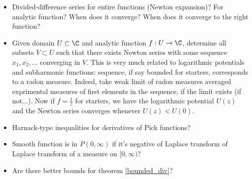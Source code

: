 \begin{itemize}
	\item Divided-difference series for entire functions (Newton expansion)? For analytic function? When does it converge? When does it converge to the right function?
	\item Given domain $U \subset \C$ and analytic function $f : U \to \C$, determine all subsets $V \subset U$ such that there exists Newton series with some sequence $x_{1}, x_{2}, \ldots$ converging in $V$. This is very much related to logarithmic potentials and subharmonic functions: sequence, if say bounded for starters, corresponds to a radon measure. Indeed, take weak limit of radon measures averaged exprimental measures of first elements in the sequence, if the limit exists (if not...). Now if $f = \frac{1}{z}$ for starters, we have the logarithmic potential $U(z)$ and the Newton series converges whenever $U(z) < U(0)$.
	\item Harnack-type inequalities for derivatives of Pick functions?
	\item Smooth function is in $P(0, \infty)$ if it's negative of Laplace transform of Laplace transform of a measure on $[0, \infty)$?
	\item Are there better bounds for theorem \ref{bounded_div}?
\end{itemize}
